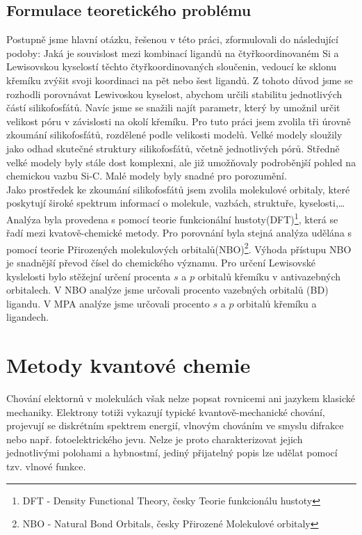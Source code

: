 \documentclass[
  digital, %
  table,   %
  lof,     %
  lot,     %
  oneside,
]{fithesis3}
\begin{document}
\section{Formulace teoretického problému}
Postupně jsme hlavní otázku, řešenou v této práci, zformulovali do následující podoby: Jaká je souvislost mezi kombinací ligandů na čtyřkoordinovaném Si a Lewisovskou kyselostí těchto čtyřkoordinovaných sloučenin, vedoucí ke sklonu křemíku zvýšit svoji koordinaci na pět nebo šest ligandů.
Z tohoto důvod jsme se rozhodli porovnávat Lewivoskou kyselost, abychom určili stabilitu jednotlivých částí silikofosfátů. Navíc jsme se snažili najít parametr, který by umožnil určit velikost póru v závislosti na okolí křemíku. Pro tuto práci jsem zvolila tři úrovně zkoumání silikofosfátů, rozdělené podle velikosti modelů. Velké modely sloužily jako odhad skutečné struktury silikofosfátů, včetně jednotlivých pórů. Středně velké modely byly stále dost komplexni, ale již umožňovaly podroběnjší pohled na chemickou vazbu Si-C. Malé modely byly snadné pro porozumění. \\
Jako prostředek ke zkoumání silikofosfátů jsem zvolila molekulové orbitaly, které poskytují široké spektrum informací o molekule, vazbách, struktuře, kyselosti,\dots  Analýza byla provedena s pomocí teorie funkcionální hustoty(DFT)\footnote{DFT - Density Functional Theory, česky Teorie funkcionálu hustoty}, která se řadí mezi kvatově-chemické metody. Pro porovnání byla stejná analýza udělána s pomocí teorie Přirozených molekulových orbitalů(NBO)\footnote{NBO - Natural Bond Orbitals, česky Přirozené Molekulové orbitaly}. Výhoda přístupu NBO je snadnější převod čísel do chemického významu. Pro určení Lewisovské kyslelosti bylo stěžejní určení procenta $s$ a $p$ orbitalů křemíku v antivazebných orbitalech.  V NBO analýze jsme určovali procento vazebných orbitalů (BD) ligandu. V MPA analýze jsme určovali procento $s$ a $p$ orbitalů křemíku a ligandech.
\newpage
\chapter{Metody kvantové chemie}
Chování elektornů v molekulách však nelze popsat rovnicemi ani jazykem klasické mechaniky. Elektrony totiži vykazují typické kvantově-mechanické chování, projevují se diskrétním spektrem energií, vlnovým chováním ve smyslu difrakce nebo např. fotoelektrického jevu. Nelze je proto charakterizovat jejich jednotlivými polohami a hybnostmí, jediný přijatelný popis lze udělat pomocí tzv. vlnové funkce.
\end{document}
